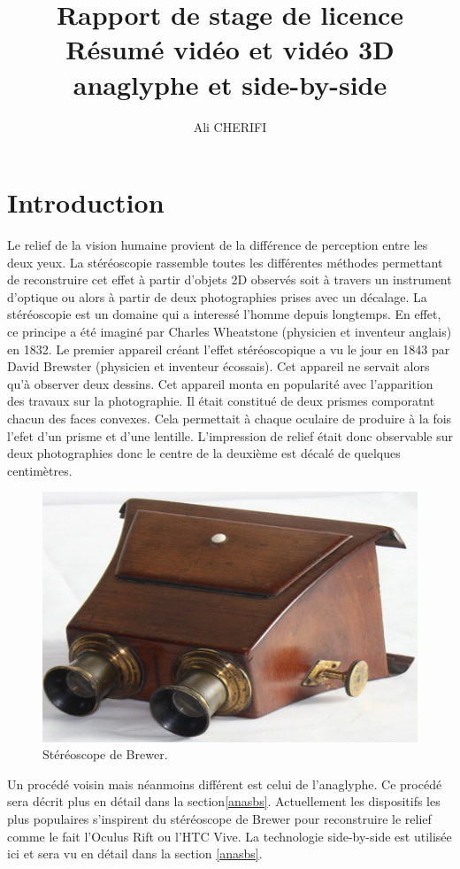 \documentclass[10pt,a4paper]{article}
\author{Ali CHERIFI}
\title{Rapport de stage de licence\\Résumé vidéo et vidéo 3D anaglyphe et side-by-side}
\begin{document}
\maketitle
\newpage
\tableofcontents
\newpage
\section{Introduction}
Le relief de la vision humaine\cite{greenwade93} provient de la différence de perception entre les deux yeux. La stéréoscopie rassemble toutes les différentes méthodes permettant de reconstruire cet effet à partir d'objets 2D
observés soit à travers un instrument d'optique ou alors à partir de deux photographies prises avec un décalage.
La stéréoscopie est un domaine qui a interessé l'homme depuis longtemps. En effet, ce principe a été imaginé par Charles Wheatstone\cite{stereoscopie} (physicien et inventeur anglais) en 1832.
Le premier appareil créant l'effet stéréoscopique a vu le jour en 1843 par David Brewster (physicien et inventeur écossais). Cet appareil ne servait alors qu'à observer deux dessins.
Cet appareil monta en popularité avec l'apparition des travaux sur la photographie. Il était constitué de deux prismes comporatnt chacun des faces convexes. Cela permettait à chaque oculaire de
produire à la fois l'efet d'un prisme et d'une lentille. L'impression de relief était donc observable sur deux photographies donc le centre de la deuxième est décalé de quelques centimètres.

\begin{figure}[!h]
\center
\includegraphics[scale = 0.5]{brewer.jpg}
\caption{Stéréoscope de Brewer.}
\end{figure}

Un procédé voisin mais néanmoins différent est celui de l'anaglyphe. Ce procédé sera décrit plus en détail dans la section\ref{anasbs}.
Actuellement les dispositifs les plus populaires s'inspirent du stéréoscope de Brewer pour reconstruire le relief comme le fait l'Oculus Rift ou l'HTC Vive. La technologie side-by-side est utilisée ici et
sera vu en détail dans la section \ref{anasbs}.
\end{document}
